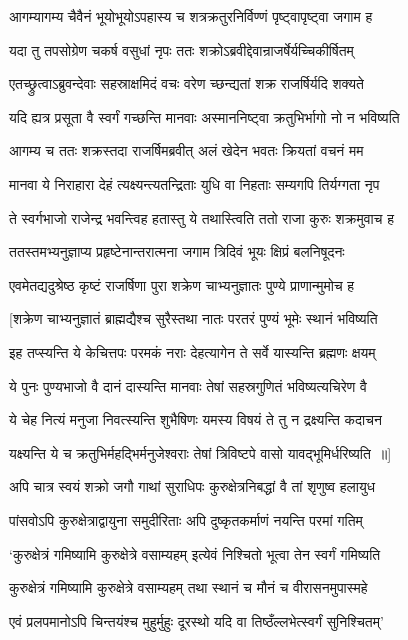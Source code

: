 \twolineshloka
{आगम्यागम्य चैवैनं भूयोभूयोऽपहास्य च}
{शत्रक्रतुरनिर्विण्णं पृष्ट्वापृष्ट्वा जगाम ह}


\twolineshloka
{यदा तु तपसोग्रेण चकर्ष वसुधां नृपः}
{ततः शक्रोऽब्रवीद्देवान्राजर्षेर्यच्चिकीर्षितम्}


\twolineshloka
{एतच्छ्रुत्वाऽब्रुवन्देवाः सहस्राक्षमिदं वचः}
{वरेण च्छन्द्यतां शक्र राजर्षिर्यदि शक्यते}


\twolineshloka
{यदि ह्यत्र प्रसूता वै स्वर्गं गच्छन्ति मानवाः}
{अस्माननिष्ट्वा क्रतुभिर्भागो नो न भविष्यति}


\twolineshloka
{आगम्य च ततः शक्रस्तदा राजर्षिमब्रवीत्}
{अलं खेदेन भवतः क्रियतां वचनं मम}


\twolineshloka
{मानवा ये निराहारा देहं त्यक्ष्यन्त्यतन्द्रिताः}
{युधि वा निहताः सम्यगपि तिर्यग्गता नृप}


\twolineshloka
{ते स्वर्गभाजो राजेन्द्र भवन्त्विह हतास्तु ये}
{तथास्त्विति ततो राजा कुरुः शक्रमुवाच ह}


\twolineshloka
{ततस्तमभ्यनुज्ञाप्य प्रहृष्टेनान्तरात्मना}
{जगाम त्रिदिवं भूयः क्षिप्रं बलनिषूदनः}


\twolineshloka
{एवमेतद्यदुश्रेष्ठ कृष्टं राजर्षिणा पुरा}
{शक्रेण चाभ्यनुज्ञातः पुण्ये प्राणान्मुमोच ह}


\twolineshloka
{[शक्रेण चाभ्यनुज्ञातं ब्राह्मद्यैश्च सुरैस्तथा}
{नातः परतरं पुण्यं भूमेः स्थानं भविष्यति}


\twolineshloka
{इह तप्स्यन्ति ये केचित्तपः परमकं नराः}
{देहत्यागेन ते सर्वे यास्यन्ति ब्रह्मणः क्षयम्}


\twolineshloka
{ये पुनः पुण्यभाजो वै दानं दास्यन्ति मानवाः}
{तेषां सहस्रगुणितं भविष्यत्यचिरेण वै}


\twolineshloka
{ये चेह नित्यं मनुजा निवत्स्यन्ति शुभैषिणः}
{यमस्य विषयं ते तु न द्रक्ष्यन्ति कदाचन}


\twolineshloka
{यक्ष्यन्ति ये च क्रतुभिर्महद्भिर्मनुजेश्वराः}
{तेषां त्रिविष्टपे वासो यावद्भूमिर्धरिष्यति ॥]}


\twolineshloka
{अपि चात्र स्वयं शक्रो जगौ गाथां सुराधिपः}
{कुरुक्षेत्रनिबद्धां वै तां शृणुष्व हलायुध}


\twolineshloka
{पांसवोऽपि कुरुक्षेत्राद्वायुना समुदीरिताः}
{अपि दुष्कृतकर्माणं नयन्ति परमां गतिम्}


\twolineshloka
{`कुरुक्षेत्रं गमिष्यामि कुरुक्षेत्रे वसाम्यहम्}
{इत्येवं निश्चितो भूत्वा तेन स्वर्गं गमिष्यति}


\twolineshloka
{कुरुक्षेत्रं गमिष्यामि कुरुक्षेत्रे वसाम्यहम्}
{तथा स्थानं च मौनं च वीरासनमुपास्महे}


\twolineshloka
{एवं प्रलपमानोऽपि चिन्तयंश्च मुहुर्मुहुः}
{दूरस्थो यदि वा तिष्ठँल्लभेत्स्वर्गं सुनिश्चितम्'}


